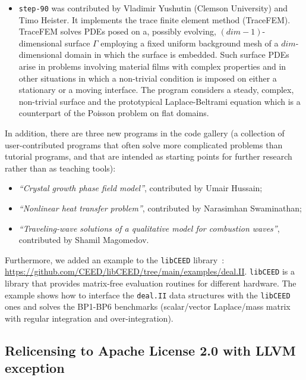 \documentclass{ansarticle-preprint}
\newcommand{\specialword}[1]{\texttt{#1}}
\newcommand{\dealii}{{\specialword{deal.II}}\xspace}
\newcommand{\step}[1]{{\specialword{step-#1}}\xspace}
\begin{document}
\begin{itemize}
    within matrix-free loops in \dealii.
  \item
    \step{90} was contributed by Vladimir Yushutin (Clemson University) and Timo Heister.
    It implements the trace finite element method (TraceFEM). TraceFEM solves PDEs
    posed on a, possibly evolving, $(dim-1)$-dimensional surface $\Gamma$ employing
    a fixed uniform background mesh of a $dim$-dimensional domain in which
    the surface is embedded. Such surface PDEs arise in problems involving
    material films with complex properties and in other situations in which
    a non-trivial condition is imposed on either a stationary or a moving interface.
    The program considers a steady, complex, non-trivial surface and the prototypical
    Laplace-Beltrami equation which is a counterpart of
    the Poisson problem on flat domains.
\end{itemize}

In addition, there are three new programs in the code gallery (a collection of
user-contributed programs that often solve more complicated problems
than tutorial programs, and that are intended as starting points for further
research rather than as teaching tools):
\begin{itemize}
  \item \emph{``Crystal growth phase field model''},
    contributed by Umair Hussain;
  \item \emph{``Nonlinear heat transfer problem''}, contributed by
    Narasimhan Swaminathan;
  \item \emph{``Traveling-wave solutions of a qualitative model for combustion waves''}, contributed by
    Shamil Magomedov.
\end{itemize}

Furthermore, we added an example to the \texttt{libCEED}
library~\cite{brown2021libceed}:
\url{https://github.com/CEED/libCEED/tree/main/examples/deal.II}.
\texttt{libCEED} is a library that provides matrix-free evaluation routines
for different hardware. The example shows how to interface the \dealii{}
data structures with the \texttt{libCEED} ones and solves the BP1-BP6
benchmarks (scalar/vector Laplace/mass matrix with regular integration and
over-integration).


\subsection{Relicensing to Apache License 2.0 with LLVM exception}
\label{sec:license}
\end{document}

